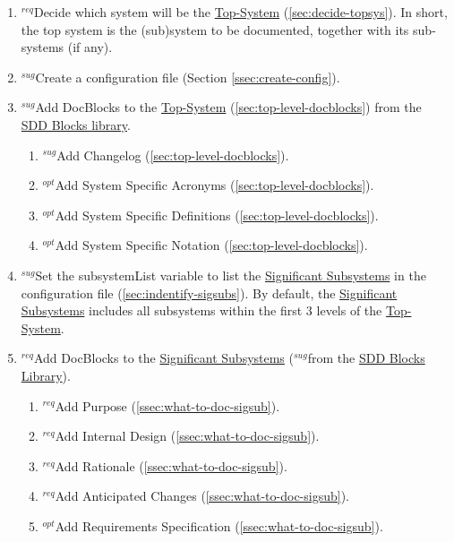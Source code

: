 \documentclass{mcscert}
\newcommand{\sddblks}{SDD Blocks Library}
\newcommand{\topsystemnolink}{Top-System} %
\newcommand{\topsystem}{\hyperref[def:topsystem]{\topsystemnolink{}}}
\newcommand{\sigsubsnolink}{Significant Subsystems} %
\newcommand{\sigsubs}{\hyperref[def:sigsubs]{\sigsubsnolink{}}}
\begin{document}
\begin{enumerate}
	\item $^{req}$Decide which system will be the \topsystem{} (\hyperref[sec:decide-topsys]{\ref*{sec:decide-topsys}}). 
	In short, the top system is the (sub)system to be documented, together with its sub-systems (if any).
	\item $^{sug}$Create a configuration file (Section \hyperref[ssec:create-config]{\ref*{ssec:create-config}}).
	\item $^{sug}$Add \textsf{DocBlocks} to the \topsystem{} (\hyperref[sec:top-level-docblocks]{\ref*{sec:top-level-docblocks}}) from the \hyperref[ssec:SDD-Blocks-Lib]{SDD Blocks library}.
	\begin{enumerate}
		\item $^{sug}$Add Changelog (\hyperref[itm:changelog]{\ref*{sec:top-level-docblocks}}).
		\item $^{opt}$Add System Specific Acronyms (\hyperref[itm:sys-acrs]{\ref*{sec:top-level-docblocks}}).
		\item $^{opt}$Add System Specific Definitions (\hyperref[itm:sys-defs]{\ref*{sec:top-level-docblocks}}).
		\item $^{opt}$Add System Specific Notation (\hyperref[itm:sys-not]{\ref*{sec:top-level-docblocks}}).
	\end{enumerate}
	\item $^{sug}$Set the subsystemList variable to list the \sigsubs{} in the configuration file (\hyperref[sec:indentify-sigsubs]{\ref*{sec:indentify-sigsubs}}). 
	By default, the \sigsubs{} includes all subsystems within the first 3 levels of the \topsystem{}.
	\item $^{req}$Add \textsf{DocBlocks} to the \sigsubs{} ($^{sug}$from the \hyperref[ssec:SDD-Blocks-Lib]{\sddblks{}}).
	\begin{enumerate}
		\item $^{req}$Add Purpose (\hyperref[itm:purpose]{\ref*{ssec:what-to-doc-sigsub}}).
		\item $^{req}$Add Internal Design (\hyperref[itm:purpose]{\ref*{ssec:what-to-doc-sigsub}}).
		\item $^{req}$Add Rationale (\hyperref[itm:rationale]{\ref*{ssec:what-to-doc-sigsub}}).
		\item $^{req}$Add Anticipated Changes	(\hyperref[itm:ant-changes]{\ref*{ssec:what-to-doc-sigsub}}).
		\item $^{opt}$Add Requirements Specification (\hyperref[itm:req-spec]{\ref*{ssec:what-to-doc-sigsub}}).
	\end{enumerate}

\end{enumerate}
\end{document}
